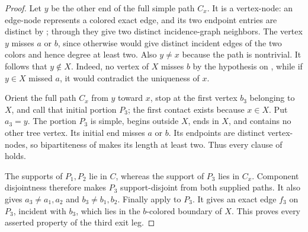 \begin{proof}
Let $y$ be the other end of the full simple path $C_x$.  It is a
vertex-node: an edge-node represents a colored exact edge, and its two
endpoint entries are distinct by ; through
 they give two distinct incidence-graph neighbors.
The vertex $y$ misses $a$ or $b$, since otherwise
 would give distinct incident edges of the two
colors and hence degree at least two.  Also $y\ne x$ because the path is
nontrivial.  It follows that $y\notin X$.  Indeed, no vertex of $X$
misses $b$ by the hypothesis on , while if
$y\in X$ missed $a$, it would contradict the uniqueness of $x$.

Orient the full path $C_x$ from $y$ toward $x$, stop at the first vertex
$b_3$ belonging to $X$, and call that initial portion $P_3$; the first
contact exists because $x\in X$.  Put $a_3=y$.  The portion $P_3$ is
simple, begins outside $X$, ends in $X$, and contains no other tree
vertex.  Its initial end misses $a$ or $b$.  Its endpoints are distinct
vertex-nodes, so bipartiteness of  makes
its length at least two.  Thus every clause of
 holds.

The supports of $P_1,P_2$ lie in $C$, whereas the support of $P_3$ lies
in $C_x$.  Component disjointness therefore makes $P_3$ support-disjoint
from both supplied paths.  It also gives $a_3\ne a_1,a_2$ and
$b_3\ne b_1,b_2$.  Finally apply
 to $P_3$.  It gives an exact
edge $f_3$ on $P_3$, incident with $b_3$, which lies in the $b$-colored
boundary of $X$.  This proves every asserted property of the third exit
leg.
\end{proof}
